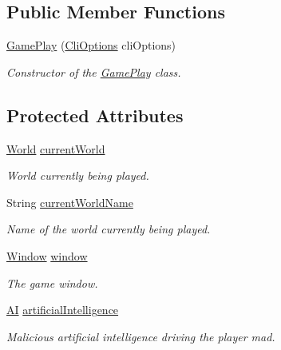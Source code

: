 \subsection*{Public Member Functions}
\begin{DoxyCompactItemize}
\item 
\hyperlink{classgameplay_1_1_game_play_acaa399a84e39a11a776da53da43ed3ea}{Game\-Play} (\hyperlink{classdebug_1_1_cli_options}{Cli\-Options} cli\-Options)
\begin{DoxyCompactList}\small\item\em Constructor of the \hyperlink{classgameplay_1_1_game_play}{Game\-Play} class. \end{DoxyCompactList}\end{DoxyCompactItemize}
\subsection*{Protected Attributes}
\begin{DoxyCompactItemize}
\item 
\hyperlink{classworld_1_1_world}{World} \hyperlink{classgameplay_1_1_game_play_acac96730473a405274e9ff0a58e4d77e}{current\-World}
\begin{DoxyCompactList}\small\item\em World currently being played. \end{DoxyCompactList}\item 
String \hyperlink{classgameplay_1_1_game_play_adcc37bdd0470d8adc27fa249d93adcff}{current\-World\-Name}
\begin{DoxyCompactList}\small\item\em Name of the world currently being played. \end{DoxyCompactList}\item 
\hyperlink{classwindow_1_1_window}{Window} \hyperlink{classgameplay_1_1_game_play_aed3cc7a8f5e4838bb0b37d4014c6133e}{window}
\begin{DoxyCompactList}\small\item\em The game window. \end{DoxyCompactList}\item 
\hyperlink{classgameplay_1_1ai_1_1_a_i}{A\-I} \hyperlink{classgameplay_1_1_game_play_a416406c147a47ba292990aa11064d9aa}{artificial\-Intelligence}
\begin{DoxyCompactList}\small\item\em Malicious artificial intelligence driving the player mad. \end{DoxyCompactList}\end{DoxyCompactItemize}



